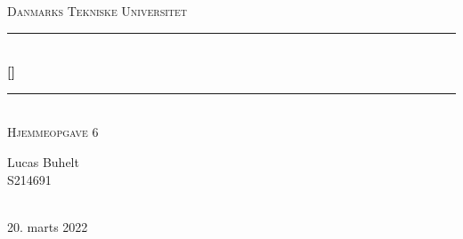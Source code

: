 \begin{titlepage}
\newcommand{\HRule}{\rule{\linewidth}{0.5mm}}
\center
\textsc{\LARGE Danmarks Tekniske Universitet}\\[1.7cm]
\HRule\\[0.5cm]
{\huge\bfseries [\Kursusenummer]  \Kursusnavn}\\[0.4cm]
\HRule\\[0.5cm]
\textsc{\Large Hjemmeopgave 6}\\[1cm]
\begin{minipage}{0.5\textwidth}
\begin{flushleft}
\centering
Lucas Buhelt\\
S214691\\[0.8cm]
\end{flushleft}
\end{minipage}
\\[1cm]
\vfill \vfill
\vfill\vfill\vfill
{\large 20. marts 2022}
\vfill
\end{titlepage}